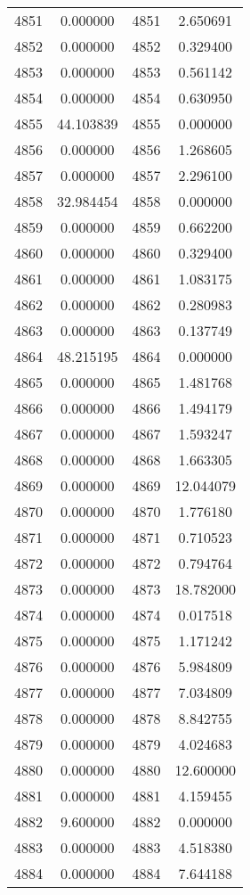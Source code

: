 \documentclass[12pt]{article}
\begin{document}
\begin{longtable}{@{}cccc@{}}
4851 & 0.000000 & 4851 & 2.650691 \\
4852 & 0.000000 & 4852 & 0.329400 \\
4853 & 0.000000 & 4853 & 0.561142 \\
4854 & 0.000000 & 4854 & 0.630950 \\
4855 & 44.103839 & 4855 & 0.000000 \\
4856 & 0.000000 & 4856 & 1.268605 \\
4857 & 0.000000 & 4857 & 2.296100 \\
4858 & 32.984454 & 4858 & 0.000000 \\
4859 & 0.000000 & 4859 & 0.662200 \\
4860 & 0.000000 & 4860 & 0.329400 \\
4861 & 0.000000 & 4861 & 1.083175 \\
4862 & 0.000000 & 4862 & 0.280983 \\
4863 & 0.000000 & 4863 & 0.137749 \\
4864 & 48.215195 & 4864 & 0.000000 \\
4865 & 0.000000 & 4865 & 1.481768 \\
4866 & 0.000000 & 4866 & 1.494179 \\
4867 & 0.000000 & 4867 & 1.593247 \\
4868 & 0.000000 & 4868 & 1.663305 \\
4869 & 0.000000 & 4869 & 12.044079 \\
4870 & 0.000000 & 4870 & 1.776180 \\
4871 & 0.000000 & 4871 & 0.710523 \\
4872 & 0.000000 & 4872 & 0.794764 \\
4873 & 0.000000 & 4873 & 18.782000 \\
4874 & 0.000000 & 4874 & 0.017518 \\
4875 & 0.000000 & 4875 & 1.171242 \\
4876 & 0.000000 & 4876 & 5.984809 \\
4877 & 0.000000 & 4877 & 7.034809 \\
4878 & 0.000000 & 4878 & 8.842755 \\
4879 & 0.000000 & 4879 & 4.024683 \\
4880 & 0.000000 & 4880 & 12.600000 \\
4881 & 0.000000 & 4881 & 4.159455 \\
4882 & 9.600000 & 4882 & 0.000000 \\
4883 & 0.000000 & 4883 & 4.518380 \\
4884 & 0.000000 & 4884 & 7.644188 \\

\end{longtable}
\end{document}
